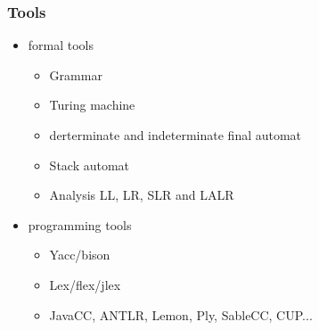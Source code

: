 \documentclass{beamer}
\begin{document}
\begin{frame}
\frametitle{Tools}
\begin{itemize}
\item formal tools
\begin{itemize}
\item Grammar
\item Turing machine
\item derterminate and indeterminate final automat
\item Stack automat
\item Analysis LL, LR, SLR and LALR
\end{itemize}
\item programming tools
\begin{itemize}
\item Yacc/bison
\item Lex/flex/jlex
\item JavaCC, ANTLR, Lemon, Ply, SableCC, CUP...
\end{itemize}
\end{itemize}
\end{frame}
\end{document}
